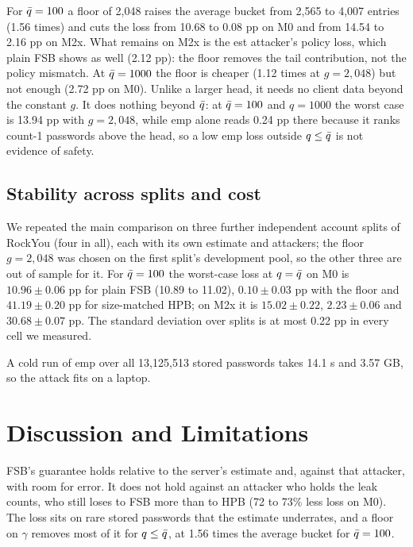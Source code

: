 For $\bar q=100$ a floor of 2,048 raises the average bucket from 2,565 to 4,007 entries (1.56 times) and cuts the loss from 10.68 to 0.08 pp on M0 and from 14.54 to 2.16 pp on M2x. What remains on M2x is the est attacker's policy loss, which plain FSB shows as well (2.12 pp): the floor removes the tail contribution, not the policy mismatch. At $\bar q=1000$ the floor is cheaper (1.12 times at $g=2{,}048$) but not enough (2.72 pp on M0). Unlike a larger head, it needs no client data beyond the constant $g$. It does nothing beyond $\bar q$: at $\bar q=100$ and $q=1000$ the worst case is 13.94 pp with $g=2{,}048$, while emp alone reads 0.24 pp there because it ranks count-1 passwords above the head, so a low emp loss outside $q\le\bar q$ is not evidence of safety.

\subsection{Stability across splits and cost}

We repeated the main comparison on three further independent account splits of RockYou (four in all), each with its own estimate and attackers; the floor $g=2{,}048$ was chosen on the first split's development pool, so the other three are out of sample for it. For $\bar q=100$ the worst-case loss at $q=\bar q$ on M0 is $10.96\pm0.06$ pp for plain FSB (10.89 to 11.02), $0.10\pm0.03$ pp with the floor and $41.19\pm0.20$ pp for size-matched HPB; on M2x it is $15.02\pm0.22$, $2.23\pm0.06$ and $30.68\pm0.07$ pp. The standard deviation over splits is at most 0.22 pp in every cell we measured.

A cold run of emp over all 13,125,513 stored passwords takes 14.1 s and 3.57 GB, so the attack fits on a laptop.

\section{Discussion and Limitations}

FSB's guarantee holds relative to the server's estimate and, against that attacker, with room for error. It does not hold against an attacker who holds the leak counts, who still loses to FSB more than to HPB (72 to 73\% less loss on M0). The loss sits on rare stored passwords that the estimate underrates, and a floor on $\gamma$ removes most of it for $q\le\bar q$, at 1.56 times the average bucket for $\bar q=100$.

